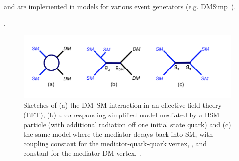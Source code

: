 \begin{marginnote}[]
 and are implemented in models for various event generators (e.g. DMSimp~\cite{NewMadgraphModels}). 
\end{marginnote}. 




\begin{figure}[!htpb]
\includegraphics[width=\textwidth]{figures/MonoX.pdf}
\caption{Sketches of (a) the DM--SM interaction in an effective field theory (EFT), (b) a corresponding simplified model mediated by a BSM particle (with additional radiation off one initial state quark) and (c) the same model where the mediator decays back into SM, with coupling constant for the mediator-quark-quark vertex, \gq, and constant for the mediator-DM vertex, \gdm.}%
\label{fig:monoX}
\end{figure}


